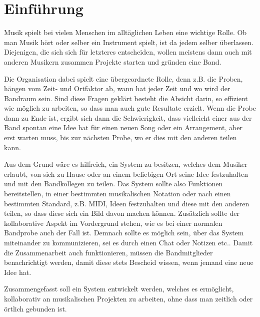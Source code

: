 \documentclass[a4paper, 12pt]{report}
\begin{document}



\tableofcontents

\newpage


\chapter{Einführung}


Musik spielt bei vielen Menschen im alltäglichen Leben eine wichtige Rolle. Ob man Musik hört oder selber ein Instrument spielt, ist da jedem selber überlassen. Diejenigen, die sich sich für letzteres entscheiden, wollen meistens dann auch mit anderen Musikern zusammen Projekte starten und gründen eine Band.

Die Organisation dabei spielt eine übergeordnete Rolle, denn z.B. die Proben, hängen vom Zeit- und Ortfaktor ab, wann hat jeder Zeit und wo wird der Bandraum sein. Sind diese Fragen geklärt besteht die Absicht darin, so effizient wie möglich zu arbeiten, so dass man auch gute Resultate erzielt. 
Wenn die Probe dann zu Ende ist, ergibt sich dann die Schwierigkeit, dass vielleicht einer aus der Band spontan eine Idee hat für einen neuen Song oder ein Arrangement, aber erst warten muss, bis zur nächsten Probe, wo er dies mit den anderen teilen kann.

Aus dem Grund wäre es hilfreich, ein System zu besitzen, welches dem Musiker erlaubt, von sich zu Hause oder an einem beliebigen Ort seine Idee festzuhalten und mit den Bandkollegen zu teilen. Das System sollte also Funktionen bereitstellen, in einer bestimmten musikalischen Notation oder nach einen bestimmten Standard, z.B. MIDI, Ideen festzuhalten und diese mit den anderen teilen, so dass diese sich ein Bild davon machen können. Zusätzlich sollte der kollaborative Aspekt im Vordergrund stehen, wie es bei einer normalen Bandprobe auch der Fall ist. Demnach sollte es möglich sein, über das System miteinander zu kommunizieren, sei es durch einen Chat oder Notizen etc.. Damit die Zusammenarbeit auch funktionieren, müssen die Bandmitglieder benachrichtigt werden, damit diese stets Bescheid wissen, wenn jemand eine neue Idee hat.

Zusammengefasst soll ein System entwickelt werden, welches es ermöglicht, kollaborativ an musikalischen Projekten zu arbeiten, ohne dass man zeitlich oder örtlich gebunden ist.
\end{document}
